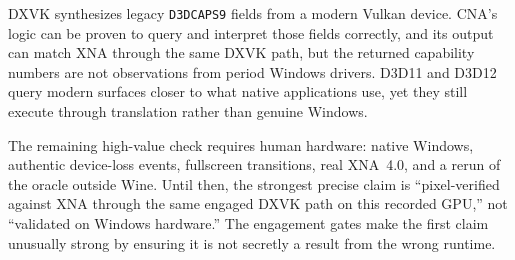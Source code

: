 DXVK synthesizes legacy \texttt{D3DCAPS9} fields from a modern Vulkan device. CNA's logic can be
proven to query and interpret those fields correctly, and its output can match XNA through the
same DXVK path, but the returned capability numbers are not observations from period Windows
drivers. D3D11 and D3D12 query modern surfaces closer to what native applications use, yet they
still execute through translation rather than genuine Windows.

The remaining high-value check requires human hardware: native Windows, authentic device-loss
events, fullscreen transitions, real XNA~4.0, and a rerun of the oracle outside Wine. Until then,
the strongest precise claim is ``pixel-verified against XNA through the same engaged DXVK path on
this recorded GPU,'' not ``validated on Windows hardware.'' The engagement gates make the first
claim unusually strong by ensuring it is not secretly a result from the wrong runtime.
